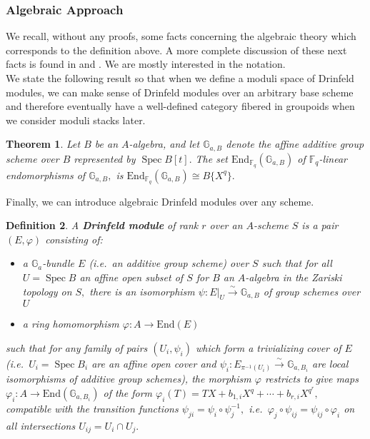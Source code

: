 \documentclass[11pt]{amsart}
\newtheorem{theorem}{Theorem}[section]
\newtheorem{definition}[theorem]{Definition}
\theoremstyle{definition}
\numberwithin{equation}{section}
\newcommand{\End}{\mathrm{End}} 	%
\newcommand{\Spec}{\operatorname{Spec}} 	%
\newcommand{\bbF}{\mathbb{F}}		%
\newcommand{\bbG}{\mathbb{G}}		%
\begin{document}
		\subsubsection{Algebraic Approach}
		
		We recall, without any proofs, some facts concerning the algebraic theory which corresponds to the definition above. A more complete discussion of these next facts is found in \cite[Definition $3.1.4$]{Papikian-Drinfeld-modules} and \cite[Lemma $3.1.4$]{Papikian-Drinfeld-modules}. We are mostly interested in the notation. \\ 
		
		We state the following result so that when we define a moduli space of Drinfeld modules, we can make sense of Drinfeld modules over an arbitrary base scheme and therefore eventually have a well-defined category fibered in groupoids when we consider moduli stacks later. 
		
		\begin{theorem}\cite[Page $65$]{Waterhouse-into-aff-grp-schemes}\label{t: endomorphisms of bbG_a}
			Let $B$ be an $A$-algebra, and let $\bbG_{a,B}$ denote the affine additive group scheme over $B$ represented by $\Spec B[t].$ The set $\End_{\bbF_q}(\bbG_{a,B})$ of $\bbF_q$-linear endomorphisms of $\bbG_{a,B},$ is 
			$\End_{\bbF_q}(\bbG_{a,B})\cong B\{X^q\}.$ 
		\end{theorem}
		
		Finally, we can introduce algebraic Drinfeld modules over any scheme.
		\begin{definition}
			A \textbf{Drinfeld module} of rank $r$ over an $A$-scheme $S$ is a pair
			$(E,\varphi)$ consisting of:
			\begin{itemize}
				\item a $\bbG_a$-bundle $E$ (i.e.\ an additive group scheme) over $S$ such that for all $U=\Spec B$ an affine open subset of $S$ for $B$ an $A$-algebra in the Zariski topology on $S,$ there is an isomorphism $\psi: E|_U\overset{\sim}{\to} \bbG_{a,B}$ of group schemes over $U$
				\item a ring homomorphism $\varphi: A\to \End(E)$
			\end{itemize}
			such that for any family of pairs $(U_i,\psi_i)$ which form a trivializing cover of $E$ (i.e.\ $U_i=\Spec B_i$ are an affine open cover and $\psi_i:E_{\pi^{-1}(U_i)}\overset{\sim}{\to}\bbG_{a,B_i}$ are local isomorphisms of additive group schemes), the morphism $\varphi$ restricts to give maps $\varphi_i:A\to \End(\bbG_{a,B_i})$ of the form $\varphi_i(T)=TX+b_{1,i}X^q+\cdots+b_{r,i}X^{q^r},$ compatible with the transition functions $\psi_{ji}=\psi_i\circ \psi_j^{-1},$ i.e.\ $\varphi_j\circ \psi_{ij}=\psi_{ij}\circ \varphi_i$ on all intersections $U_{ij}=U_i\cap U_j.$
		\end{definition}
		
\end{document}
